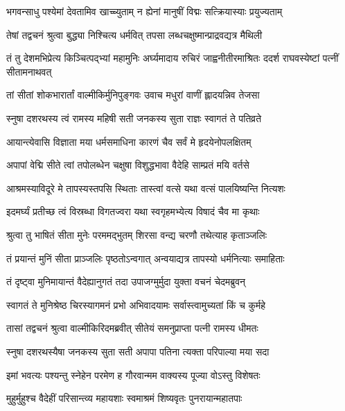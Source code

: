 \twolineshloka
{भगवन्साधु पश्येमां देवतामिव खाच्च्युताम्}
{न ह्येनां मानुषीं विद्मः सत्क्रियास्याः प्रयुज्यताम्} %

\twolineshloka
{तेषां तद्वचनं श्रुत्वा बुद्ध्या निश्चित्य धर्मवित्}
{तपसा लब्धचक्षुष्मान्प्राद्रवद्यत्र मैथिली} %

\threelineshloka
{तं तु देशमभिप्रेत्य किञ्चित्पद्भ्यां महामुनिः}
{अर्घ्यमादाय रुचिरं जाह्वनीतीरमाश्रितः}
{ददर्श राघवस्येष्टां पत्नीं सीतामनाथवत्} %

\twolineshloka
{तां सीतां शोकभारार्तां वाल्मीकिर्मुनिपुङ्गवः}
{उवाच मधुरां वाणीं ह्लादयन्निव तेजसा} %

\twolineshloka
{स्नुषा दशरथस्य त्वं रामस्य महिषी सती}
{जनकस्य सुता राज्ञः स्वागतं ते पतिव्रते} %

\twolineshloka
{आयान्त्येवासि विज्ञाता मया धर्मसमाधिना}
{कारणं चैव सर्वं मे हृदयेनोपलक्षितम्} %

\twolineshloka
{अपापां वेद्मि सीते त्वां तपोलब्धेन चक्षुषा}
{विशुद्धभावा वैदेहि साम्प्रतं मयि वर्तसे} %

\twolineshloka
{आश्रमस्याविदूरे मे तापस्यस्तपसि स्थिताः}
{तास्त्वां वत्से यथा वत्सं पालयिष्यन्ति नित्यशः} %

\twolineshloka
{इदमर्घ्यं प्रतीच्छ त्वं विस्रब्धा विगतज्वरा}
{यथा स्वगृहमभ्येत्य विषादं चैव मा कृथाः} %

\twolineshloka
{श्रुत्वा तु भाषितं सीता मुनेः परममद्भुतम्}
{शिरसा वन्द्य चरणौ तथेत्याह कृताञ्जलिः} %

\twolineshloka
{तं प्रयान्तं मुनिं सीता प्राञ्जलिः पृष्ठतोऽन्वगात्}
{अन्वयाद्यत्र तापस्यो धर्मनित्याः समाहिताः} %

\twolineshloka
{तं दृष्ट्वा मुनिमायान्तं वैदेह्यानुगतं तदा}
{उपाजग्मुर्मुदा युक्ता वचनं चेदमब्रुवन्} %

\twolineshloka
{स्वागतं ते मुनिश्रेष्ठ चिरस्यागमनं प्रभो}
{अभिवादयामः सर्वास्त्वामुच्यतां किं च कुर्महे} %

\twolineshloka
{तासां तद्वचनं श्रुत्वा वाल्मीकिरिदमब्रवीत्}
{सीतेयं समनुप्राप्ता पत्नी रामस्य धीमतः} %

\twolineshloka
{स्नुषा दशरथस्यैषा जनकस्य सुता सती}
{अपापा पतिना त्यक्ता परिपाल्या मया सदा} %

\twolineshloka
{इमां भवत्यः पश्यन्तु स्नेहेन परमेण ह}
{गौरवान्मम वाक्यस्य पूज्या वोऽस्तु विशेषतः} %

\twolineshloka
{मुहुर्मुहुश्च वैदेहीं परिसान्त्व्य महायशाः}
{स्वमाश्रमं शिष्यवृतः पुनरायान्महातपाः} %


